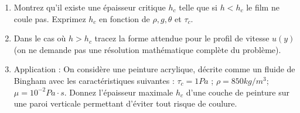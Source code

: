 \begin{enumerate}
\item Montrez qu'il existe une épaisseur critique $h_c$ telle que si $h<h_c$ le film ne coule pas.
Exprimez $h_c$ en fonction de $\rho,g,\theta$ et $\tau_c$.

\item Dans le cas où $h>h_c$ tracez la forme attendue pour le profil de vitesse $u(y)$ 
(on ne demande pas une résolution mathématique complète du problème).

\item Application : 
On considère une peinture acrylique, décrite comme un fluide de Bingham avec les caractéristiques suivantes : $\tau_c = 1 Pa$ ; $\rho = 850 kg/m^3$; $\mu = 10^{-2} Pa \cdot s$. Donnez l'épaisseur maximale $h_c$ d'une couche de peinture sur une paroi verticale permettant d'éviter tout risque de coulure.

\end{enumerate}
